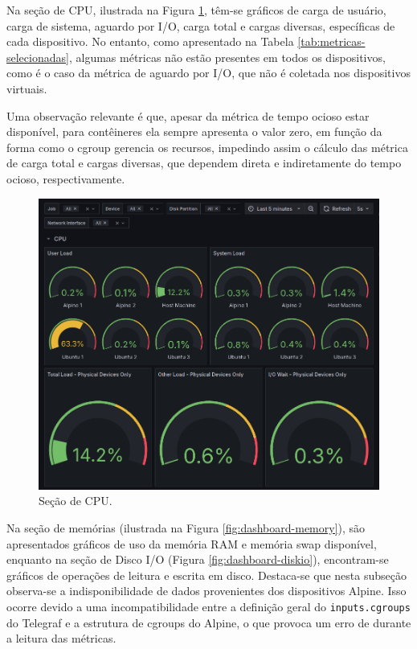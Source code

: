 Na seção de CPU, ilustrada na Figura \ref{fig:dashboard-cpu}, 
têm-se gráficos de carga de usuário, carga de sistema, aguardo por I/O, carga total e cargas diversas, específicas de cada dispositivo. No entanto, como apresentado na Tabela \ref{tab:metricas-selecionadas}, algumas métricas não estão presentes em todos os dispositivos, como é o caso da métrica de aguardo por I/O, que não é coletada nos dispositivos virtuais.

Uma observação relevante é que, apesar da métrica de tempo ocioso estar disponível, para contêineres ela sempre apresenta o valor zero, em função da forma como o cgroup gerencia os recursos, impedindo assim o cálculo das métrica de carga total e cargas diversas, que dependem direta e indiretamente do tempo ocioso, respectivamente.

\begin{figure}[H]
\centering
\setlength{\abovecaptionskip}{-20pt}
\includegraphics[width=\textwidth]{Imagens/chap04/dashboard/cpu.png}
\caption{Seção de CPU.}
\label{fig:dashboard-cpu}
\end{figure}

Na seção de memórias (ilustrada na Figura \ref{fig:dashboard-memory}), são apresentados gráficos de uso da memória RAM e memória swap disponível, enquanto na seção de Disco I/O (Figura \ref{fig:dashboard-diskio}), encontram-se gráficos de operações de leitura e escrita em disco. Destaca-se que nesta subseção observa-se a indisponibilidade de dados provenientes dos dispositivos Alpine. Isso ocorre devido a uma incompatibilidade entre a definição geral do \verb|inputs.cgroups| do Telegraf e a estrutura de cgroups do Alpine, o que provoca um erro de  durante a leitura das métricas.

